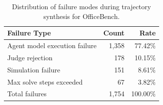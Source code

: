 \begin{table}[t]
\centering
\small
\begin{tabular}{lrr}
\toprule
\textbf{Failure Type} & \textbf{Count} & \textbf{Rate} \\
\midrule
Agent model execution failure & 1,358 & 77.42\% \\
Judge rejection & 178 & 10.15\% \\
Simulation failure & 151 & 8.61\% \\
Max solve steps exceeded & 67 & 3.82\% \\
\midrule
Total failures & 1,754 & 100.00\% \\
\bottomrule
\end{tabular}
\caption{Distribution of failure modes during trajectory synthesis for OfficeBench.}
\label{tab:ob_failure_distribution}
\end{table}
